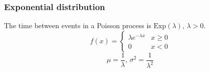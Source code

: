 \subsubsection{Exponential distribution}
The time between events in a Poisson process is $\textrm{Exp}(\lambda),\,\lambda>0$.
\[f(x) = \left\{
\begin{array}{cl}
\lambda e^{-\lambda x} & x\geq0\\
0 & x<0
\end{array}\right.\]
\[\mu=\frac{1}{\lambda},\,\sigma^2=\frac{1}{\lambda^2}\]




